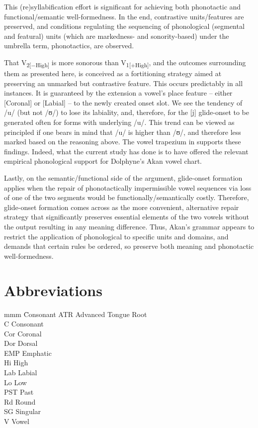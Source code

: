\documentclass[output=paper,colorlinks,citecolor=brown]{langscibook}
\begin{document}
This (re)syllabification effort is significant for achieving both phonotactic and functional/semantic well-formedness. In the end, contrastive units/features are preserved, and conditions regulating the sequencing of phonological (segmental and featural) units (which are markedness- and sonority-based) under the umbrella term, phonotactics, are observed. 

That V\textsubscript{2[−High]} is more sonorous than V\textsubscript{1[+High]}, and the outcomes surrounding them as presented here, is conceived as a fortitioning strategy aimed at preserving an unmarked but contrastive feature. This occurs predictably in all instances. It is guaranteed by the extension a vowel's place feature -- either [Coronal] or [Labial] -- to the newly created onset slot. We see the tendency of /u/ (but not /ʊ/) to lose its labiality, and, therefore, for the [j] glide-onset to be generated often for forms with underlying /u/. This trend can be viewed as principled if one bears in mind that /u/ is higher than /ʊ/, and therefore less marked based on the reasoning above. The vowel trapezium in \citet[7]{Dolphyne1988} supports these findings. Indeed, what the current study has done is to have offered the relevant empirical phonological support for Dolphyne's Akan vowel chart.\largerpage

Lastly, on the semantic/functional side of the argument, glide-onset formation applies when the repair of phonotactically impermissible vowel sequences via loss of one of the two segments would be functionally/semantically costly. Therefore, glide-onset formation comes across as the more convenient, alternative repair strategy that significantly preserves essential elements of the two vowels without the output resulting in any meaning difference. Thus, Akan's grammar appears to restrict the application of phonological to specific units and domains, and demands that certain rules be ordered, so preserve both meaning and phonotactic well-formedness.



\section*{Abbreviations}
\begin{multicols}{2}
\begin{tabbing}
mmm \= Consonant\kill
ATR \> Advanced Tongue Root \\
C \> Consonant \\
Cor  \> Coronal \\
Dor \> Dorsal \\
EMP \> Emphatic \\
Hi \> High \\
Lab \> Labial \\
Lo \> Low \\
PST \> Past \\
Rd \> Round \\
SG \> Singular \\
V \> Vowel 
\end{tabbing}
\end{multicols}
\end{document}
